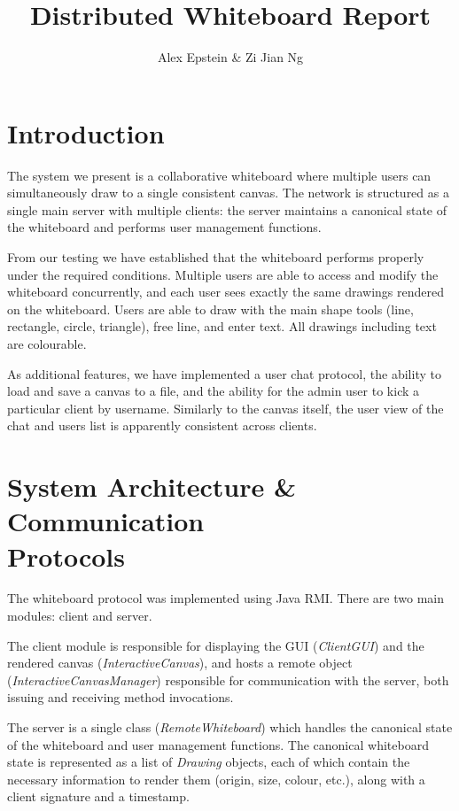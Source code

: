 \documentclass[12pt,a4paper]{article}
\title{Distributed Whiteboard Report}
\author{Alex Epstein \& Zi Jian Ng}
\begin{document}
\maketitle


\section{Introduction}

The system we present is a collaborative whiteboard where multiple users can simultaneously draw to a single consistent canvas. The network is structured as a single main server with multiple clients: the server maintains a canonical state of the whiteboard and performs user management functions. 

From our testing we have established that the whiteboard performs properly under the required conditions. Multiple users are able to access and modify the whiteboard concurrently, and each user sees exactly the same drawings rendered on the whiteboard. Users are able to draw with the main shape tools (line, rectangle, circle, triangle), free line, and enter text. All drawings including text are colourable. 

As additional features, we have implemented a user chat protocol, the ability to load and save a canvas to a file, and the ability for the admin user to kick a particular client by username. Similarly to the canvas itself, the user view of the chat and users list is apparently consistent across clients. 

\section{System Architecture \& Communication \\Protocols}

The whiteboard protocol was implemented using Java RMI. There are two main modules: client and server. 

The client module is responsible for displaying the GUI (\textit{ClientGUI}) and the rendered canvas (\textit{InteractiveCanvas}), and hosts a remote object (\textit{InteractiveCanvasManager}) responsible for communication with the server, both issuing and receiving method invocations. 

The server is a single class (\textit{RemoteWhiteboard}) which handles the canonical state of the whiteboard and user management functions. The canonical whiteboard state is represented as a list of \textit{Drawing} objects, each of which contain the necessary information to render them (origin, size, colour, etc.), along with a client signature and a timestamp. 
\end{document}
